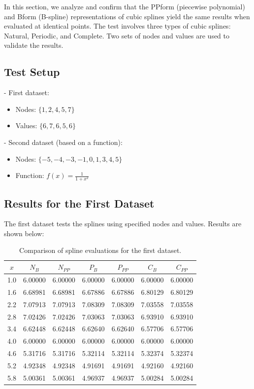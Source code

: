 \documentclass[a4paper]{article}
\begin{document}
In this section, we analyze and confirm that the PPform (piecewise polynomial) and Bform (B-spline) representations of cubic splines yield the same results when evaluated at identical points. The test involves three types of cubic splines: Natural, Periodic, and Complete. Two sets of nodes and values are used to validate the results.

\subsection*{Test Setup}

  - First dataset:
    \begin{itemize}
      \item Nodes: $\{1, 2, 4, 5, 7\}$
      \item Values: $\{6, 7, 6, 5, 6\}$
    \end{itemize}
  - Second dataset (based on a function):
    \begin{itemize}
      \item Nodes: $\{-5, -4, -3, -1, 0, 1, 3, 4, 5\}$
      \item Function: $f(x) = \frac{1}{1 + x^2}$
    \end{itemize}

\subsection*{Results for the First Dataset}

The first dataset tests the splines using specified nodes and values. Results are shown below:

\begin{table}[ht]
\centering
\begin{tabular}{|c|c|c|c|c|c|c|}
\hline
$x$ & $N_B$ & $N_{PP}$ & $P_B$ & $P_{PP}$ & $C_B$ & $C_{PP}$ \\
\hline
1.0 & 6.00000 & 6.00000 & 6.00000 & 6.00000 & 6.00000 & 6.00000 \\
1.6 & 6.68981 & 6.68981 & 6.67886 & 6.67886 & 6.80129 & 6.80129 \\
2.2 & 7.07913 & 7.07913 & 7.08309 & 7.08309 & 7.03558 & 7.03558 \\
2.8 & 7.02426 & 7.02426 & 7.03063 & 7.03063 & 6.93910 & 6.93910 \\
3.4 & 6.62448 & 6.62448 & 6.62640 & 6.62640 & 6.57706 & 6.57706 \\
4.0 & 6.00000 & 6.00000 & 6.00000 & 6.00000 & 6.00000 & 6.00000 \\
4.6 & 5.31716 & 5.31716 & 5.32114 & 5.32114 & 5.32374 & 5.32374 \\
5.2 & 4.92348 & 4.92348 & 4.91691 & 4.91691 & 4.92160 & 4.92160 \\
5.8 & 5.00361 & 5.00361 & 4.96937 & 4.96937 & 5.00284 & 5.00284 \\
\hline
\end{tabular}
\caption*{Comparison of spline evaluations for the first dataset.}
\end{table}
\end{document}
